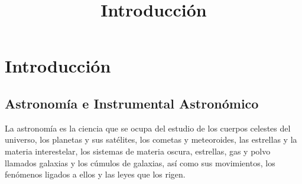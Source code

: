 \chapter{Introducción}
\title{Introducción}
\label{cap:Introduccion}

\section{Astronomía e Instrumental Astronómico}
La astronomía es la ciencia que se ocupa del estudio de los cuerpos celestes del universo, los planetas y sus satélites, los cometas y meteoroides, las estrellas y la materia interestelar, los sistemas de materia oscura, estrellas, gas y polvo llamados galaxias y los cúmulos de galaxias, así como sus movimientos, los fenómenos ligados a ellos y las leyes que los rigen. \\

